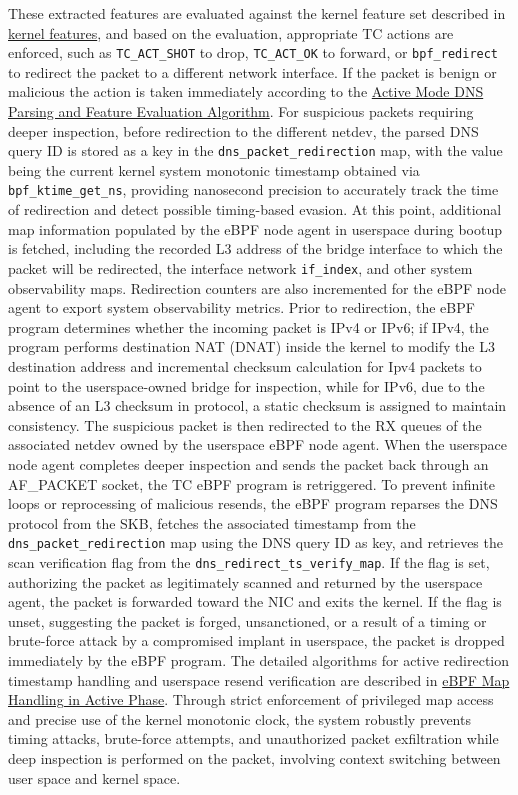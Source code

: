 \documentclass [11pt, proquest] {uwthesis}[2020/02/24]
\begin{document}
These extracted features are evaluated against the kernel feature set described in \hyperref[sec:feature-kernel]{kernel features}, and based on the evaluation, appropriate TC actions are enforced, such as \texttt{TC\_ACT\_SHOT} to drop, \texttt{TC\_ACT\_OK} to forward, or \texttt{bpf\_redirect} to redirect the packet to a different network interface. If the packet is benign or malicious the action is taken immediately according to the \hyperref[sec:alg1]{Active Mode DNS Parsing and Feature Evaluation Algorithm}. For suspicious packets requiring deeper inspection, before redirection to the different netdev, the parsed DNS query ID is stored as a key in the \texttt{dns\_packet\_redirection} map, with the value being the current kernel system monotonic timestamp obtained via \texttt{bpf\_ktime\_get\_ns}, providing nanosecond precision to accurately track the time of redirection and detect possible timing-based evasion. At this point, additional map information populated by the eBPF node agent in userspace during bootup is fetched, including the recorded L3 address of the bridge interface to which the packet will be redirected, the interface network \texttt{if\_index}, and other system observability maps. Redirection counters are also incremented for the eBPF node agent to export system observability metrics. Prior to redirection, the eBPF program determines whether the incoming packet is IPv4 or IPv6; if IPv4, the program performs destination NAT (DNAT) inside the kernel to modify the L3 destination address and incremental checksum calculation for Ipv4 packets to point to the userspace-owned bridge for inspection, while for IPv6, due to the absence of an L3 checksum in protocol, a static checksum is assigned to maintain consistency. The suspicious packet is then redirected to the RX queues of the associated netdev owned by the userspace eBPF node agent. When the userspace node agent completes deeper inspection and sends the packet back through an AF\_PACKET socket, the TC eBPF program is retriggered. To prevent infinite loops or reprocessing of malicious resends, the eBPF program reparses the DNS protocol from the SKB, fetches the associated timestamp from the \texttt{dns\_packet\_redirection} map using the DNS query ID as key, and retrieves the scan verification flag from the \texttt{dns\_redirect\_ts\_verify\_map}. If the flag is set, authorizing the packet as legitimately scanned and returned by the userspace agent, the packet is forwarded toward the NIC and exits the kernel. If the flag is unset, suggesting the packet is forged, unsanctioned, or a result of a timing or brute-force attack by a compromised implant in userspace, the packet is dropped immediately by the eBPF program. The detailed algorithms for active redirection timestamp handling and userspace resend verification are described in \hyperref[sec:alg2]{eBPF Map Handling in Active Phase}. Through strict enforcement of privileged map access and precise use of the kernel monotonic clock, the system robustly prevents timing attacks, brute-force attempts, and unauthorized packet exfiltration while deep inspection is performed on the packet, involving context switching between user space and kernel space.
\end{document}
